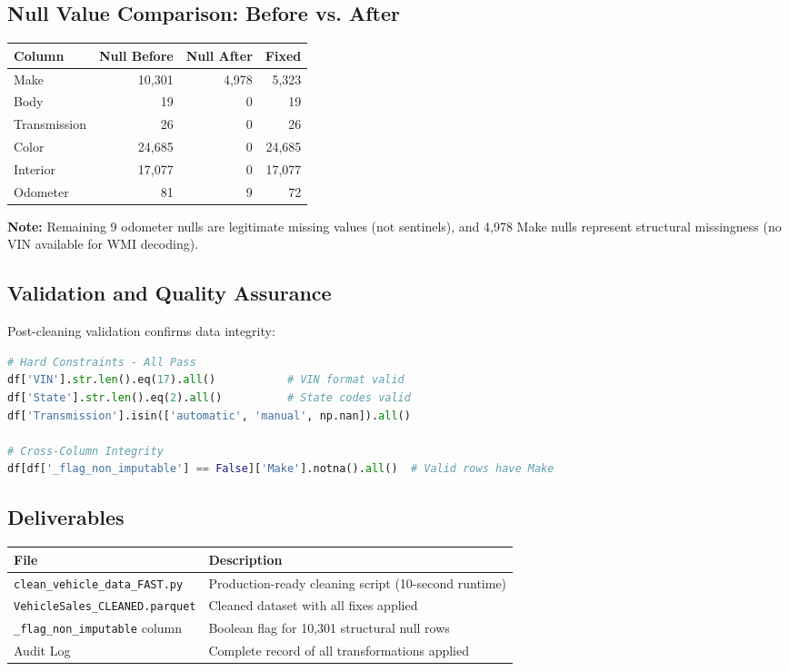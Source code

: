 \documentclass[12pt,a4paper]{article}
\begin{document}
\subsection{Null Value Comparison: Before vs. After}

\begin{center}
\begin{tabular}{lrrr}
\toprule
\textbf{Column} & \textbf{Null Before} & \textbf{Null After} & \textbf{Fixed} \\
\midrule
Make & 10,301 & 4,978 & 5,323 \\
Body & 19 & 0 & 19 \\
Transmission & 26 & 0 & 26 \\
Color & 24,685 & 0 & 24,685 \\
Interior & 17,077 & 0 & 17,077 \\
Odometer & 81 & 9 & 72 \\
\bottomrule
\end{tabular}
\end{center}

\textbf{Note:} Remaining 9 odometer nulls are legitimate missing values (not sentinels), and 4,978 Make nulls represent structural missingness (no VIN available for WMI decoding).

\subsection{Validation and Quality Assurance}

Post-cleaning validation confirms data integrity:

\begin{lstlisting}[language=Python, caption={Validation Checks}]
# Hard Constraints - All Pass
df['VIN'].str.len().eq(17).all()           # VIN format valid
df['State'].str.len().eq(2).all()          # State codes valid
df['Transmission'].isin(['automatic', 'manual', np.nan]).all()

# Cross-Column Integrity
df[df['_flag_non_imputable'] == False]['Make'].notna().all()  # Valid rows have Make
\end{lstlisting}

\subsection{Deliverables}

\begin{center}
\begin{tabular}{lp{8cm}}
\toprule
\textbf{File} & \textbf{Description} \\
\midrule
\texttt{clean\_vehicle\_data\_FAST.py} & Production-ready cleaning script (10-second runtime) \\
\texttt{VehicleSales\_CLEANED.parquet} & Cleaned dataset with all fixes applied \\
\texttt{\_flag\_non\_imputable} column & Boolean flag for 10,301 structural null rows \\
Audit Log & Complete record of all transformations applied \\
\bottomrule
\end{tabular}
\end{center}
\end{document}
